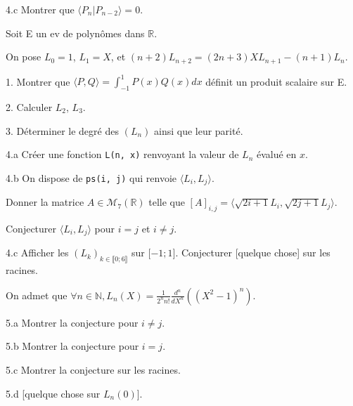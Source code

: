 \vspace{5pt}
4.c  Montrer que $\langle P_n | P_{n-2} \rangle = 0$.



\subetoiles
\columnbreak



\noindent Soit E un ev de polynômes dans $\mathbb{R}$.

\noindent On pose $L_0 = 1$, $L_1 = X$, et $(n+2)L_{n+2} = (2n+3)XL_{n+1} - (n+1)L_n$.

\vspace{5pt}
1. Montrer que $\displaystyle \langle P, Q\rangle = \int_{-1}^{1} P(x)Q(x)dx$ définit un produit scalaire sur E.

\vspace{5pt}
2. Calculer $L_2$, $L_3$.

\vspace{5pt}
3. Déterminer le degré des $(L_n)$ ainsi que leur parité.

\vspace{5pt}
4.a Créer une fonction \lstinline {L(n, x)} renvoyant la valeur de $L_n$ évalué en $x$.

\vspace{5pt}
4.b On dispose de \lstinline {ps(i, j)} qui renvoie $\langle L_i, L_j\rangle$.

Donner la matrice $A \in \mathcal{M}_7(\mathbb{R})$ telle que
$[A]_{i,j} = \langle\sqrt{2i+1}L_i, \sqrt{2j+1}L_j\rangle$.

Conjecturer $\langle L_i, L_j\rangle$ pour $i=j$ et $i \neq j$.

\vspace{5pt}
4.c Afficher les $(L_k)_{k \in \llbracket 0;6 \rrbracket}$ sur $\lbrack -1;1 \rbrack$.
Conjecturer [quelque chose] sur les racines.

\vspace{5pt}
\noindent On admet que
$\displaystyle \forall n \in \mathbb{N}, L_n(X) = \frac {1} {2^nn!} \frac {d^n} {dX^n} \left( (X^2-1)^n \right)$.

\vspace{5pt}
5.a Montrer la conjecture pour $i \neq j$.

\vspace{5pt}
5.b Montrer la conjecture pour $i = j$.

\vspace{5pt}
5.c Montrer la conjecture sur les racines.

\vspace{5pt}
5.d [quelque chose sur $L_n(0)$].


